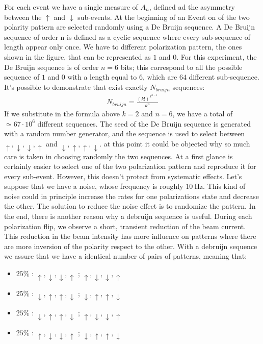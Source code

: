 For each event we have a single measure of $A_{n}$, defined ad the asymmetry between the $\uparrow$ and $\downarrow$ sub-events.
At the beginning of an Event on of the two polarity pattern are selected randomly using a De Bruijn sequence. A De Bruijn sequence of order n is defined as a cyclic sequence where every sub-sequence of length appear only once. We have to different polarization pattern, the ones shown in the figure, that can be represented as $1$ and $0$. For this experiment, the De Bruijn sequence is of order $n = 6$ bits; this correspond to all the possible sequence of $1$ and $0$ with a length equal to $6$, which are $64$ different sub-sequence.
It's possible to demonstrate that exist exactly $N_{bruijn}$ sequences: 
\begin{align*}
N_{bruijn} = \frac{(k!)^{k^{n-1}}}{k^{n}}
\end{align*}
If we substitute in the formula above $k=2$ and $n = 6$, we have a total of $\simeq 67 \cdot 10^{6}$ different sequences. The seed of the De Bruijn sequence is generated with a random number generator, and the sequence is used to select between $\uparrow,\downarrow,\downarrow, \uparrow$  and $\downarrow,\uparrow,\uparrow,\downarrow$. at this point it could be objected why so much care is taken in choosing randomly the two sequences. At a first glance is certainly easier to select one of the two polarization pattern and reproduce it for every sub-event. However, this doesn't protect from systematic effects.
Let's suppose that we have a noise, whose frequency is roughly $\SI{10}{\hertz}$. This kind of noise could in principle increase the rates for one polarizations state and decrease the other. The solution to reduce the noise effect is to randomize the pattern. 
In the end, there is another reason why a debruijn sequence is useful. During each polarization flip, we observe a short, transient reduction of the beam current. This reduction in the beam intensity has more influence on patterns where there are more inversion of the polarity respect to the other. With a debruijn sequence we assure that we have a identical number of pairs of patterns, meaning that:

\begin{itemize}
\item $25\%$ : $\uparrow,\downarrow,\downarrow, \uparrow$ ; $\uparrow,\downarrow,\downarrow, \uparrow$
\item $25\%$ : $\downarrow,\uparrow, \uparrow,\downarrow$ ; $\downarrow,\uparrow, \uparrow,\downarrow$
\item $25\%$ : $\downarrow,\uparrow, \uparrow,\downarrow$ ; $\uparrow,\downarrow,\downarrow, \uparrow$
\item $25\%$ : $\uparrow,\downarrow,\downarrow, \uparrow$ ; $\downarrow,\uparrow, \uparrow,\downarrow$
\end{itemize}


